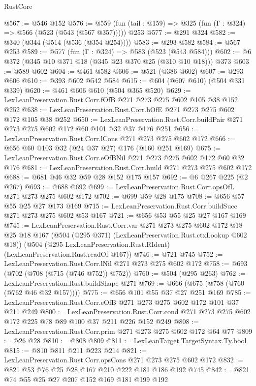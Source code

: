 \begin{lexlean}{RustCore}
\begin{coremodule}
{\begin{coremodule}
{{{{{@567 := @546 @152
@576 := @559 (fun (tail : @159) => @325 (fun (Γ : @324) => @566 (@523 (@543 (@567 @357))))) @253
@577 := @291 @324
@582 := @340 (@344 (@514 (@536 (@354 @254))))
@583 := @293 @582
@584 := @567 @253
@589 := @577 (fun (Γ : @324) => @583 (@523 (@543 @584)))
@602 := @6 @372 (@345 @10 @371 @18 (@345 @23 @370 @25 (@310 @10 @18))) @373
@603 := @589 @602
@604 := @461 @582
@606 := @521 (@386 @602)
@607 := @293 @606
@610 := @393 @602 @542 @584
@615 := @604 (@607 @610) (@504 @331 @339)
@620 := @461 @606 @610 (@504 @365 @520)
@629 := LexLeanPreservation.Rust.Corr.fOfB @271 @273 @275 @602 @105 @38 @152 @252
@638 := LexLeanPreservation.Rust.Corr.bOfE @271 @273 @275 @602 @172 @105 @38 @252
@650 := LexLeanPreservation.Rust.Corr.buildPair @271 @273 @275 @602 @172 @60 @101 @32 @37 @176 @251
@656 := LexLeanPreservation.Rust.Corr.lCons @271 @273 @275 @602 @172
@666 := @656 @60 @103 @32 (@24 @37 @27) @176 (@160 @251 @169)
@675 := LexLeanPreservation.Rust.Corr.eOfBNil @271 @273 @275 @602 @172 @60 @32 @176
@681 := LexLeanPreservation.Rust.Corr.build @271 @273 @275 @602 @172
@688 := @681 @46 @32 @59 @28 @152 @175 @157
@692 := @6 @267 @225 (@2 @267)
@693 := @688 @692
@699 := LexLeanPreservation.Rust.Corr.opsOfL @271 @273 @275 @602 @172
@702 := @699 @59 @28 @175
@708 := @656 @57 @55 @25 @27 @173 @169
@715 := LexLeanPreservation.Rust.Corr.buildSucc @271 @273 @275 @602 @53 @167
@721 := @656 @53 @55 @25 @27 @167 @169
@745 := LexLeanPreservation.Rust.Corr.var
    @271
    @273
    @275
    @602
    @172
    @18
    @25
    @18
    @167
    (@504 (@295 @371) (LexLeanPreservation.Rust.ctxLookup @602 @18))
    (@504 (@295 LexLeanPreservation.Rust.RIdent) (LexLeanPreservation.Rust.readOf @167))
@746 := @721 @745
@752 := LexLeanPreservation.Rust.Corr.lNil @271 @273 @275 @602 @172
@758 := @693 (@702 (@708 (@715 (@746 @752)) @752))
@760 := @504 (@295 @263)
@762 := LexLeanPreservation.Rust.buildShape @271
@769 := @666 (@675 (@758 (@760 (@762 @46 @32 @157))))
@775 := @656 @101 @55 @37 @27 @251 @169
@785 := LexLeanPreservation.Rust.Corr.eOfB @271 @273 @275 @602 @172 @101 @37 @211 @249
@800 := LexLeanPreservation.Rust.Corr.cond
    @271
    @273
    @275
    @602
    @172
    @225
    @78
    @89
    @100
    @37
    @211
    @226
    @152
    @249
@808 := LexLeanPreservation.Rust.Corr.prim @271 @273 @275 @602 @172 @64 @77
@809 := @26 @28
@810 := @808 @809
@811 := LexLeanTarget.TargetSyntax.Ty.bool
@815 := @810 @811 @211 @223 @214
@821 := LexLeanPreservation.Rust.Corr.opsCons @271 @273 @275 @602 @172
@832 := @821 @53 @76 @25 @28 @167 @210 @222 @181 @186 @192 @745
@842 := @821 @74 @55 @25 @27 @207 @152 @169 @181 @199 @192
}}}}}
\end{coremodule}}
\end{coremodule}
\end{lexlean}
